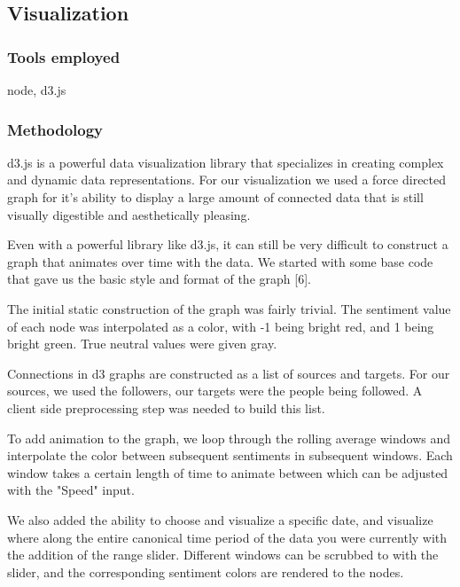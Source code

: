 \documentclass[11pt]{article}
\begin{document}
\subsection{Visualization}

\subsubsection{Tools employed}
node, d3.js

\subsubsection{Methodology}

d3.js is a powerful data visualization library that specializes in creating complex and dynamic data representations.
For our visualization we used a force directed graph for it's ability to display a large amount of connected data that is still
visually digestible and aesthetically pleasing.\newline

Even with a powerful library like d3.js, it can still be very difficult to construct a graph that animates over time with the data.
We started with some base code that gave us the basic style and format of the graph [6].\newline

The initial static construction of the graph was fairly trivial. The sentiment value of each node was interpolated as a color, with -1
being bright red, and 1 being bright green. True neutral values were given gray.\newline

Connections in d3 graphs are constructed as a list of sources and targets. For our sources, we used the followers, our targets 
were the people being followed. A client side preprocessing step was needed to build this list.\newline

To add animation to the graph, we loop through the rolling average windows and interpolate the color between subsequent sentiments
in subsequent windows. Each window takes a certain length of time to animate between which can be adjusted with the "Speed" input.\newline

We also added the ability to choose and visualize a specific date, and visualize where along the entire canonical time period of the data
you were currently with the addition of the range slider. Different windows can be scrubbed to with the slider, and the corresponding
sentiment colors are rendered to the nodes.
\end{document}
